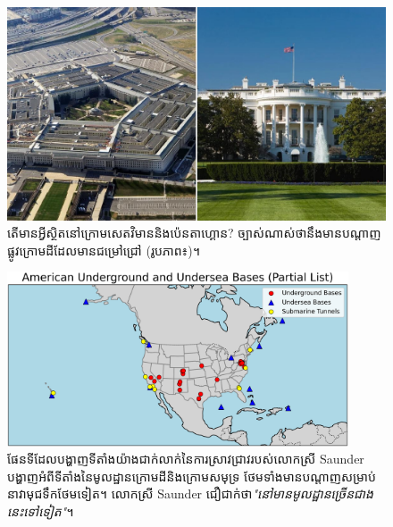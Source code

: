 \documentclass[10pt,twocolumn,letterpaper]{article}
\begin{document}
\begin{figure}[b]
\begin{center}
   \includegraphics[width=1\linewidth]{penta.jpg}
\end{center}
   \caption{តើមានអ្វីស្ថិតនៅក្រោមសេតវិមាននិងប៉េនតាហ្គោន? ច្បាស់ណាស់ថានឹងមានបណ្តាញផ្លូវក្រោមដីដែលមានជម្រៅជ្រៅ (រូបភាព៖\cite{31})។}
\label{fig:3}
\label{fig:onecol}
\end{figure}
\begin{figure}[t]
\begin{center}
\includegraphics[width=0.9\textwidth]{basescrop.png}
\end{center}
\caption{ផែនទីដែលបង្ហាញទីតាំងយ៉ាងជាក់លាក់នៃការស្រាវជ្រាវរបស់លោកស្រី​ Saunder បង្ហាញអំពីទីតាំងនៃមូលដ្ឋានក្រោមដីនិងក្រោមសមុទ្រ ថែមទាំងមានបណ្តាញសម្រាប់នាវាមុជទឹកថែមទៀត។ លោកស្រី Saunder ជឿជាក់ថា\textit{"នៅមានមូលដ្ឋានច្រើនជាងនេះទៅទៀត"}\cite{22}។}
\label{fig:4}
\end{figure}
\end{document}
